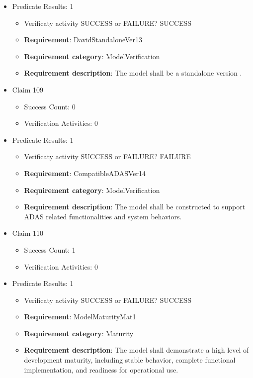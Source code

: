 \documentclass{article}
\begin{document}
\begin{itemize}
									    
				\item Predicate Results: 1
					\begin{itemize}				
					\item Verificaty activity SUCCESS or FAILURE? SUCCESS
					
					\item \textbf{Requirement}: DavidStandaloneVer13 
					\item \textbf{Requirement category}: ModelVerification
					\item \textbf{Requirement description}: The model shall be a standalone version .
					\end{itemize}

  				  \item Claim 109
				\begin{itemize}
			    	\item Success Count: 0 
			    	\item Verification Activities: 0
				\end{itemize}
				
									    
				\item Predicate Results: 1
					\begin{itemize}				
					\item Verificaty activity SUCCESS or FAILURE? FAILURE
					
					\item \textbf{Requirement}: CompatibleADASVer14 
					\item \textbf{Requirement category}: ModelVerification
					\item \textbf{Requirement description}: The model shall be constructed to support ADAS related functionalities and system behaviors.
					\end{itemize}

  				  \item Claim 110
				\begin{itemize}
			    	\item Success Count: 1 
			    	\item Verification Activities: 0
				\end{itemize}
				
									    
				\item Predicate Results: 1
					\begin{itemize}				
					\item Verificaty activity SUCCESS or FAILURE? SUCCESS
					
					\item \textbf{Requirement}: ModelMaturityMat1 
					\item \textbf{Requirement category}: Maturity
					\item \textbf{Requirement description}: The model shall demonstrate a high level of development maturity, including stable behavior, complete functional implementation, and readiness for operational use.
					\end{itemize}


\end{itemize}
\end{document}
